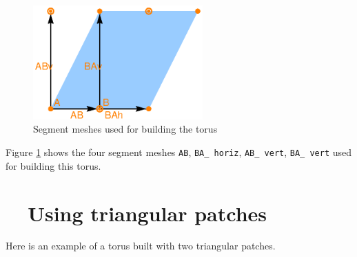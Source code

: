 \begin{figure}[ht] \centering
  \includegraphics[width=65mm]{torus-sketch.eps}
  \caption{Segment meshes used for building the torus}
  \label{\numb section 7.\numb fig 5}
\end{figure}

Figure \ref{\numb section 7.\numb fig 5} shows the four segment meshes {\small\tt AB},
{\small\tt BA\_\,horiz}, {\small\tt AB\_\,vert}, {\small\tt BA\_\,vert} used for
building this torus.


\section{~~Using triangular patches}\label{\numb section 7.\numb parag 9}

Here is an example of a torus built with two triangular patches.

